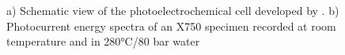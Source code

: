 \begin{figure}[h]
\begin{subfigure}{\coef\textwidth}
            \caption{}
            \label{fig:skocic_phd_htpec}
        \end{subfigure}
        
        \caption{a) Schematic view of the photoelectrochemical cell developed by \citet{skocic2016}. 
        b) Photocurrent energy spectra of an X750 specimen recorded at room
        temperature and in 280°C/80 bar water \citep{skocic2016}}
        \label{fig:skocic_phd}
    \end{figure}
